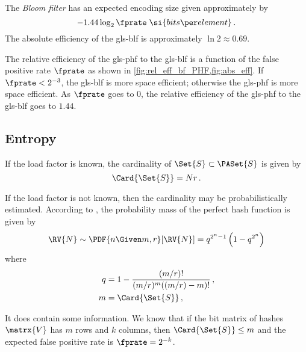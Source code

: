 The \emph{Bloom filter} has an expected encoding size given approximately by
\begin{equation}
    -1.44 \log_2 \fprate \; \si{bits \per element}\,.
\end{equation}
The absolute efficiency of the \gls{gls-blf} is approximately $\ln 2 \approx 0.69$.

The relative efficiency of the \gls{gls-phf} to the \gls{gls-blf} is a function of the false positive rate $\fprate$ as shown in \cref{fig:rel_eff_bf_PHF,fig:abs_eff}. If $\fprate < 2^{-3}$, the \gls{gls-blf} is more space efficient; otherwise the \gls{gls-phf} is more space efficient. As $\fprate$ goes to $0$, the relative efficiency of the \gls{gls-phf} to the \gls{gls-blf} goes to $1.44$. 

\subsection{Entropy}
If the load factor is known, the cardinality of $\Set{S} \subset \PASet{S}$ is given by
\begin{equation}
    \Card{\Set{S}} = N r\,.
\end{equation}

If the load factor is not known, then the cardinality may be probabilistically estimated.
According to \cite{}, the probability mass of the perfect hash function is given by
\begin{equation}
    \RV{N} \sim \PDF{n \Given m, r}[\RV{N}] = q^{2^n-1}\left(1 - q^{2^n}\right)
\end{equation}
where
\begin{equation}
\begin{split}
	q &= 1 - \frac{(m/r)!}{(m/r)^m ((m/r)-m)!}\,,\\
	m &= \Card{\Set{S}}\,,\\
\end{split}
\end{equation}


It does contain some information. We know that if the bit matrix of hashes $\matrx{V}$ has $m$ rows and $k$ columns, then $\Card{\Set{S}} \leq m$ and the expected false positive rate is $\fprate=2^{-k}$.


